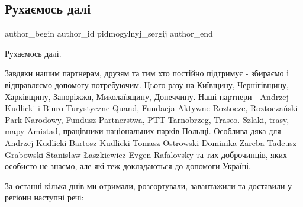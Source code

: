  
 
 
 
 
 
\subsection{Рухаємось далі}
\label{sec:08_04_2022.fb.pidmogylnyj_sergij.1.ruhaemos_dali}
 
\ifcmt
 author_begin
   author_id pidmogylnyj_sergij
 author_end
\fi

Рухаємось далі.

Завдяки нашим партнерам, друзям та тим хто постійно підтримує - збираємо і
відправляємо допомогу потребуючим. Цього разу на Київщину, Чернігівщину,
Харківщину, Запоріжжя, Миколаївщину, Донеччину. Наші партнери - \href{https://www.facebook.com/andrzej.kudlicki.5}{Andrzej
Kudlicki} i \href{https://www.facebook.com/bt.quand}{Biuro Turystyczne Quand}, \href{https://www.facebook.com/Fundacja-Aktywne-Roztocze-105436672088049}{Fundacja Aktywne Roztocze}, \href{https://www.facebook.com/RoztoczanskiPN}{Roztoczański
Park Narodowy}, \href{https://www.facebook.com/Fundusz.Partnerstwa}{Fundusz Partnerstwa}, 
\href{https://www.facebook.com/ptt.tarnobrzeg}{PTT Tarnobrzeg}, \href{https://www.facebook.com/Traseo}{Traseo. Szlaki, trasy, mapy
Amistad}, працівники національних парків Польщі. Особлива дяка для \href{https://www.facebook.com/andrzej.kudlicki.5}{Andrzej
Kudlicki} \href{https://www.facebook.com/bartosz.kudlicki}{Bartosz Kudlicki} \href{https://www.facebook.com/tomasz.ostrowski.714}{Tomasz Ostrowski} \href{https://www.facebook.com/ekoturystyka}{Dominika Zareba} Tadeusz Grabowski
\href{https://www.facebook.com/profile.php?id=100015203526124}{Stanisław Łaszkiewicz} \href{https://www.facebook.com/evgen.rafalovsky}{Evgen Rafalovsky} та тих доброчинців, яких особисто не
знаємо, але які теж докладаються до допомоги Україні. 


За останні кілька днів ми отримали, розсортували, завантажили та доставили у регіони наступні речі:

